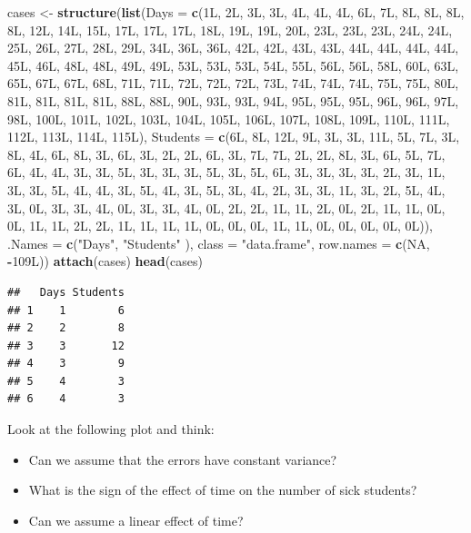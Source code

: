 \documentclass[]{book}
\newenvironment{Shaded}{\begin{snugshade}}{\end{snugshade}}
\newcommand{\DataTypeTok}[1]{\textcolor[rgb]{0.13,0.29,0.53}{#1}}
\newcommand{\KeywordTok}[1]{\textcolor[rgb]{0.13,0.29,0.53}{\textbf{#1}}}
\newcommand{\NormalTok}[1]{#1}
\newcommand{\OperatorTok}[1]{\textcolor[rgb]{0.81,0.36,0.00}{\textbf{#1}}}
\newcommand{\OtherTok}[1]{\textcolor[rgb]{0.56,0.35,0.01}{#1}}
\newcommand{\StringTok}[1]{\textcolor[rgb]{0.31,0.60,0.02}{#1}}
\providecommand{\tightlist}{%
  \setlength{\itemsep}{0pt}\setlength{\parskip}{0pt}}
\theoremstyle{definition}
\theoremstyle{definition}
\theoremstyle{definition}
\theoremstyle{remark}
\begin{document}
\begin{Shaded}
\begin{Highlighting}[]
\NormalTok{cases <-}\StringTok{  }
\KeywordTok{structure}\NormalTok{(}\KeywordTok{list}\NormalTok{(}\DataTypeTok{Days =} \KeywordTok{c}\NormalTok{(1L, 2L, 3L, 3L, 4L, 4L, 4L, 6L, 7L, 8L, }
\NormalTok{8L, 8L, 8L, 12L, 14L, 15L, 17L, 17L, 17L, 18L, 19L, 19L, 20L, }
\NormalTok{23L, 23L, 23L, 24L, 24L, 25L, 26L, 27L, 28L, 29L, 34L, 36L, 36L, }
\NormalTok{42L, 42L, 43L, 43L, 44L, 44L, 44L, 44L, 45L, 46L, 48L, 48L, 49L, }
\NormalTok{49L, 53L, 53L, 53L, 54L, 55L, 56L, 56L, 58L, 60L, 63L, 65L, 67L, }
\NormalTok{67L, 68L, 71L, 71L, 72L, 72L, 72L, 73L, 74L, 74L, 74L, 75L, 75L, }
\NormalTok{80L, 81L, 81L, 81L, 81L, 88L, 88L, 90L, 93L, 93L, 94L, 95L, 95L, }
\NormalTok{95L, 96L, 96L, 97L, 98L, 100L, 101L, 102L, 103L, 104L, 105L, }
\NormalTok{106L, 107L, 108L, 109L, 110L, 111L, 112L, 113L, 114L, 115L), }
    \DataTypeTok{Students =} \KeywordTok{c}\NormalTok{(6L, 8L, 12L, 9L, 3L, 3L, 11L, 5L, 7L, 3L, 8L, }
\NormalTok{    4L, 6L, 8L, 3L, 6L, 3L, 2L, 2L, 6L, 3L, 7L, 7L, 2L, 2L, 8L, }
\NormalTok{    3L, 6L, 5L, 7L, 6L, 4L, 4L, 3L, 3L, 5L, 3L, 3L, 3L, 5L, 3L, }
\NormalTok{    5L, 6L, 3L, 3L, 3L, 3L, 2L, 3L, 1L, 3L, 3L, 5L, 4L, 4L, 3L, }
\NormalTok{    5L, 4L, 3L, 5L, 3L, 4L, 2L, 3L, 3L, 1L, 3L, 2L, 5L, 4L, 3L, }
\NormalTok{    0L, 3L, 3L, 4L, 0L, 3L, 3L, 4L, 0L, 2L, 2L, 1L, 1L, 2L, 0L, }
\NormalTok{    2L, 1L, 1L, 0L, 0L, 1L, 1L, 2L, 2L, 1L, 1L, 1L, 1L, 0L, 0L, }
\NormalTok{    0L, 1L, 1L, 0L, 0L, 0L, 0L, 0L)), }\DataTypeTok{.Names =} \KeywordTok{c}\NormalTok{(}\StringTok{"Days"}\NormalTok{, }\StringTok{"Students"}
\NormalTok{), }\DataTypeTok{class =} \StringTok{"data.frame"}\NormalTok{, }\DataTypeTok{row.names =} \KeywordTok{c}\NormalTok{(}\OtherTok{NA}\NormalTok{, }\OperatorTok{-}\NormalTok{109L))}
\KeywordTok{attach}\NormalTok{(cases)}
\KeywordTok{head}\NormalTok{(cases) }
\end{Highlighting}
\end{Shaded}

\begin{verbatim}
##   Days Students
## 1    1        6
## 2    2        8
## 3    3       12
## 4    3        9
## 5    4        3
## 6    4        3
\end{verbatim}

Look at the following plot and think:

\begin{itemize}
\tightlist
\item
  Can we assume that the errors have constant variance?
\item
  What is the sign of the effect of time on the number of sick students?
\item
  Can we assume a linear effect of time?
\end{itemize}
\end{document}

